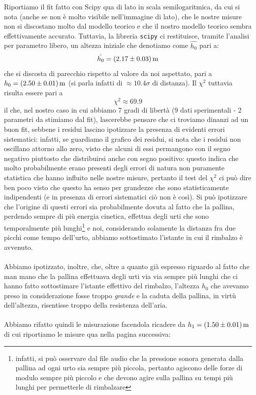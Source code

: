 \documentclass{article}
\begin{document}
\noindent Riportiamo il fit fatto con Scipy qua di lato in scala semilogaritmica, da cui si nota (anche se non è molto visibile nell'immagine di lato), che le nostre misure non si discostano molto dal modello teorico e che il nostro modello teorico sembra effettivamente accurato. Tuttavia, la libreria \texttt{scipy} ci restituisce, tramite l'analisi per parametro libero, un altezza iniziale che denotiamo come $\hat{h_0}$ pari a:
\begin{equation}
	\hat{h_0} = (2.17 \pm 0.03) \, \text{\unit{m}}
\end{equation}
che si discosta di parecchio rispetto al valore da noi aspettato, pari a $h_0 = (2.50 \pm 0.01) \, \text{\unit{m}}$ (si parla infatti di $\approx 10.4\sigma$ di distanza). Il $\chi^2$ tuttavia risulta essere pari a
\begin{equation}
	\chi^2 \approx 69.9
\end{equation}
il che, nel nostro caso in cui abbiamo 7 gradi di libertà (9 dati sperimentali - 2 parametri da stimiamo dal fit), lascerebbe pensare che ci troviamo dinanzi ad un buon fit, sebbene i residui lascino ipotizzare la presenza di evidenti errori sistematici: infatti, se guardiamo il grafico dei residui, si nota che i residui non oscillano attorno allo zero, visto che alcuni di essi permangono con il segno negativo piuttosto che distribuirsi anche con segno positivo: questo indica che molto probabilmente erano presenti degli errori di natura non puramente statistica che hanno influito nelle nostre misure, pertanto il test del $\chi^2$ ci può dire ben poco visto che questo ha senso per grandezze che sono statisticamente indipendenti (e in presenza di errori sistematici ciò non è così). Si può ipotizzare che l'origine di questi errori sia probabilmente dovuta al fatto che la pallina, perdendo sempre di più energia cinetica, effettua degli urti che sono temporalmente più lunghi\footnote{infatti, si può osservare dal file audio che la pressione sonora generata dalla pallina ad ogni urto sia sempre più piccola, pertanto agiscono delle forze di modulo sempre più piccolo e che devono agire sulla pallina su tempi più lunghi per permetterle di rimbalzare} e noi, considerando solamente la distanza fra due picchi come tempo dell'urto, abbiamo sottostimato l'istante in cui il rimbalzo è avvenuto. \\ \\
Abbiamo ipotizzato, inoltre, che, oltre a quanto già espresso riguardo al fatto che man mano che la pallina effettuava degli urti via via sempre più lunghi che ci hanno fatto sottostimare l'istante effettivo del rimbalzo, l'altezza $h_0$ che avevamo preso in considerazione fosse troppo \emph{grande} e la caduta della pallina, in virtù dell'altezza, risentisse troppo della resistenza dell'aria. \\ \\
Abbiamo rifatto quindi le misurazione facendola ricadere da $h_1 = (1.50 \pm 0.01) \, \text{\unit{m}}$ di cui riportiamo le misure qua nella pagina successiva: 
\end{document}
